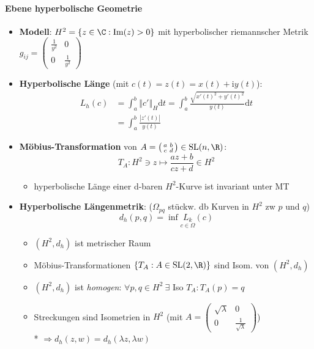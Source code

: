 \paragraph{Ebene hyperbolische Geometrie}
\begin{itemize}
  \item \textbf{Modell}: \( H^2 = \left \{ z \in \C : \text{Im}(z) > 0 \right \} \) mit hyperbolischer riemannscher Metrik \( g_{ij} = \left( \begin{smallmatrix}
    \frac{1}{y^2} & 0 \\ 0 & \frac{1}{y^2}
  \end{smallmatrix} \right) \)
  \item \textbf{Hyperbolische Länge} (mit \( c(t) = z(t) = x(t) + \text{i}y(t) \)):
  \begin{align*}
    L_h(c) &= \int_a^b \left\Vert c' \right\Vert_H \text{d}t = \int_a^b \frac{\sqrt{x'{(t)}^2+y'{(t)}^2}}{y(t)} \text{d}t \\
     &= \int_a^b \frac{\left\vert z'(t) \right\vert}{y(t)}
  \end{align*}
  \item \textbf{Möbius-Transformation} von \( A = \left( \begin{smallmatrix}
    a & b \\ c & d
  \end{smallmatrix} \right) \in \text{SL}(n,\R) \):
  \begin{equation*}
    T_A : H^2 \ni z \mapsto \frac{az+b}{cz+d} \in H^2
  \end{equation*}
  \begin{itemize}
    \item hyperbolische Länge einer d-baren \( H^2 \)-Kurve ist invariant unter MT
  \end{itemize}
  \item \textbf{Hyperbolische Längenmetrik}: (\( \Omega_{pq} \) stückw. db Kurven in \( H^2 \) zw \( p \) und \( q \))
  \begin{equation*}
    d_h(p,q) = \inf \underset{c \in \Omega}{L_k}(c)
  \end{equation*}
  \begin{itemize}
    \item \( (H^2, d_h) \) ist metrischer Raum
    \item Möbius-Transformationen \( \left \{ T_A : A \in \text{SL}(2,\R) \right \} \) sind Isom. von \( (H^2, d_h) \)
    \item \( (H^2, d_h) \) ist \emph{homogen}: \( \forall p,q \in H^2 \ \exists \) Iso \( T_A : T_A(p) = q \)
    \item Streckungen sind Isometrien in \( H^2 \) (mit \( A = \left( \begin{smallmatrix}
      \sqrt{\lambda} & 0 \\ 0 & \frac{1}{\sqrt{\lambda}}
    \end{smallmatrix} \right) \)) \\*
    \( \Rightarrow d_h(z,w) = d_h(\lambda z, \lambda w) \)
  \end{itemize}
\end{itemize}

